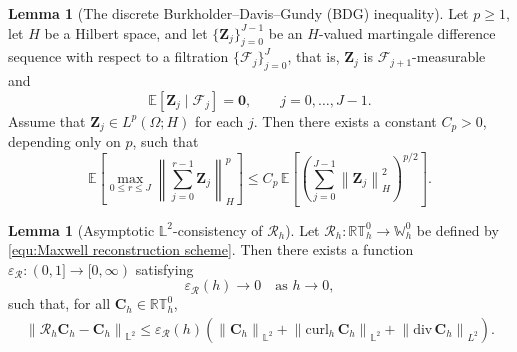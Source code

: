 \documentclass[11pt, reqno]{amsart}
\theoremstyle{definition}
\newtheorem{lemma}[theorem]{Lemma}
\numberwithin{equation}{section}
\newcommand{\divg}{\mathrm{div}\,}
\newcommand{\bff}{\boldsymbol}
\newcommand{\bb}{\mathbb}
\newcommand{\norm}[2]{\left\|{#1}\right\|_{#2}}
\newcommand{\curlh}{\mathrm{curl}_h\,}
\begin{document}
\begin{lemma}[The discrete Burkholder--Davis--Gundy (BDG) inequality]\label{lem:discrete-BDG}
	Let $p\ge 1$, let $H$ be a Hilbert space, and let
	$\{\bff Z_j\}_{j=0}^{J-1}$ be an $H$-valued martingale difference sequence
	with respect to a filtration \(\{\mathcal F_j\}_{j=0}^{J}\), that is,
	\(\bff Z_j\) is \(\mathcal F_{j+1}\)-measurable and
	\[
	\mathbb E[\bff Z_j\mid\mathcal F_j]=\bff0,
	\qquad
	j=0,\ldots,J-1.
	\]
	Assume that \(\bff Z_j\in L^p(\Omega;H)\) for each \(j\). Then there exists
	a constant \(C_p>0\), depending only on \(p\), such that
	\begin{equation}\label{eq:discrete-BDG-square-function}
		\bb E\left[
		\max_{0\le r\le J}
		\norm{\sum_{j=0}^{r-1}\bff Z_j}{H}^{p}
		\right]
		\le
		C_p\,
		\bb E\left[
		\left(
		\sum_{j=0}^{J-1}\norm{\bff Z_j}{H}^{2}
		\right)^{p/2}
		\right].
	\end{equation}
\end{lemma}


\begin{lemma}[Asymptotic \(\bb L^2\)-consistency of $\mathcal R_h$]
	\label{lem:Maxwell reconstruction L2 consistency}
	Let \(\mathcal R_h:\bb{RT}_h^0\to\bb W_h^0\) be defined by
	\eqref{equ:Maxwell reconstruction scheme}. Then there exists a function $\varepsilon_{\mathcal R}:(0,1]\to[0,\infty)$ satisfying
	\[
	\varepsilon_{\mathcal R}(h)\to0
	\quad\text{as }h\to0,
	\]
	such that, for all \(\bff C_h\in\bb{RT}_h^0\),
	\begin{align}
		\label{equ:Rh L2 consistency asymptotic}
		\norm{\mathcal R_h\bff C_h-\bff C_h}{\bb L^2}
		\le
		\varepsilon_{\mathcal R}(h)
		\left(
		\norm{\bff C_h}{\bb L^2}
		+
		\norm{\curlh\bff C_h}{\bb L^2}
		+
		\norm{\divg\bff C_h}{L^2}
		\right).
	\end{align}
\end{lemma}
\end{document}
